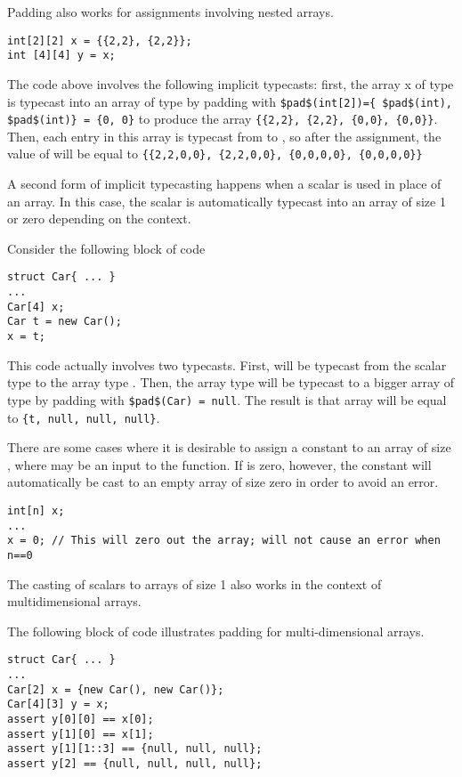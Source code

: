 \begin{Example}
Padding also works for assignments involving nested arrays.
\begin{lstlisting}
int[2][2] x = {{2,2}, {2,2}};
int [4][4] y = x;
\end{lstlisting}

The code above involves the following implicit typecasts: first, the array x of type  is typecast into an array of type  by padding with \lstinline!$pad$(int[2])={ $pad$(int), $pad$(int)} = {0, 0}! to produce the array \lstinline!{{2,2}, {2,2}, {0,0}, {0,0}}!. Then, each entry in this array is typecast from  to , so after the assignment, the value of  will be equal to \lstinline!{{2,2,0,0}, {2,2,0,0}, {0,0,0,0}, {0,0,0,0}}!
\end{Example}


A second form of implicit typecasting happens when a scalar is used in place of an array. In this case, the scalar is automatically typecast into an array of size 1 or zero depending on the context.

\begin{Example}
Consider the following block of code 
\begin{lstlisting}
struct Car{ ... }
...
Car[4] x;
Car t = new Car();
x = t;
\end{lstlisting}
This code actually involves two typecasts. First,  will be typecast from the scalar type  to the array type . Then, the array type  will be typecast to a bigger array of type  by padding with \lstinline!$pad$(Car) = null!. The result is that array will be equal to \lstinline!{t, null, null, null}!.
\end{Example}

There are some cases where it is desirable to assign a constant to an array of size , where  may be an input to the function. If  is zero, however, the constant will automatically be cast to an empty array of size zero in order to avoid an error.

\begin{Example}
\begin{lstlisting}
int[n] x;
...
x = 0; // This will zero out the array; will not cause an error when n==0
\end{lstlisting}
\end{Example}


The casting of scalars to arrays of size 1 also works in the context of multidimensional arrays.
\begin{Example}
The following block of code illustrates padding for multi-dimensional arrays.
\begin{lstlisting}
struct Car{ ... }
...
Car[2] x = {new Car(), new Car()};
Car[4][3] y = x;
assert y[0][0] == x[0];
assert y[1][0] == x[1];
assert y[1][1::3] == {null, null, null};
assert y[2] == {null, null, null, null};
\end{lstlisting}
\end{Example}

